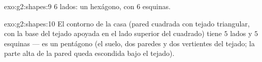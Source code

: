 \begin{solution}{exo:g2:shapes:9}
$6$ lados: un hexágono, con $6$ esquinas.
\end{solution}

\begin{solution}{exo:g2:shapes:10}
El contorno de la casa (pared cuadrada con tejado triangular, con la base del
tejado apoyada en el lado superior del cuadrado) tiene $5$ lados y $5$ esquinas ---
es un pentágono (el suelo, dos paredes y dos vertientes del tejado; la parte
alta de la pared queda escondida bajo el tejado).
\end{solution}
